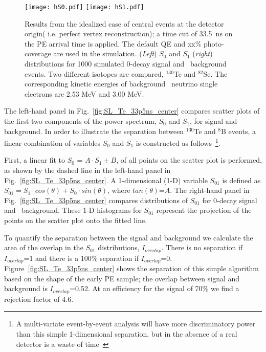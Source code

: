 \begin{figure*}[h]
\centering
\texttt{[image: hS0.pdf]}
\texttt{[image: hS1.pdf]}
\caption{Results from the idealized case of central events at the
  detector origin( i.e. perfect vertex reconstruction); a time cut of 33.5~ns
  on the PE arrival time is applied. The default QE and xx\%
  photo-coverage are used in the simulation.  (\emph{Left}) $S_0$ and
  $S_1$ (\emph{right}) distributions for 1000 simulated 0\nbb-decay
  signal and \B~background events.  Two different isotopes are
  compared, $^{130}$Te and $^{82}$Se. The corresponding kinetic
  energies of background \B~neutrino single electrons are 2.53 MeV and
  3.00 MeV.}
\label{fig:S_vs_energy}
\end{figure*}

The left-hand panel in Fig.~\ref{fig:SL_Te_33p5ns_center} compares
scatter plots of the first two components of the power spectrum, $S_0$
and $S_1$, for signal and background. In order to illustrate the
separation between $^{130}$Te and $^{8}$B events, a linear combination
of variables $S_0$ and $S_1$ is constructed as follows~\footnote{A
multi-variate event-by-event analysis will have more discriminatory
power than this simple 1-dimensional separation, but in the absence of
a real detector is a waste of time~\cite{goldberger_watson}}.

First, a linear fit to $S_0$ = $A \cdot S_1 + B$, of all points on the
scatter plot is performed, as shown by the dashed line in the left-hand
panel in Fig.~\ref{fig:SL_Te_33p5ns_center}. A 1-dimensional (1-D) variable
$S_{01}$ is defined as $S_{01} = S_1 \cdot cos(\theta) + S_0 \cdot
sin(\theta)$, where $tan(\theta)$=$A$. The right-hand panel in
Fig.~\ref{fig:SL_Te_33p5ns_center} compares distributions of $S_{01}$
for 0\nbb-decay signal and \B~background. These 1-D histograms for
$S_{01}$ represent the projection of the points on the scatter plot
onto the fitted line.

To quantify the separation between the signal and background we
calculate the area of the overlap in the $S_{01}$ distributions,
$I_{overlap}$. There is no separation if $I_{overlap}$=1 and there is
a 100\% separation if
$I_{overlap}$=0. Figure~\ref{fig:SL_Te_33p5ns_center} shows the
separation of this simple algorithm based on the shape of the early PE
sample; the overlap between signal and background is
$I_{overlap}$=0.52. At an efficiency for the signal of
70\% we find a rejection factor of 4.6.




